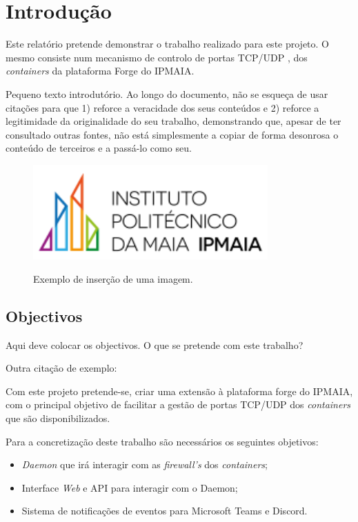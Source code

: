 \chapter{Introdução}
\label{chap:introduction}

Este relatório pretende demonstrar o trabalho realizado para este projeto.
O mesmo consiste num mecanismo de controlo de portas TCP/UDP \cite{rfc9293},
\cite{rfc768} dos \textit{containers} da plataforma Forge do IPMAIA.


Pequeno texto introdutório. Ao longo do documento,
não se esqueça de usar citações \cite{ismai_ead} para que 1)
reforce a veracidade dos seus conteúdos e 2) reforce a legitimidade da
originalidade do seu trabalho, demonstrando que, apesar de ter 
consultado outras fontes, não está simplesmente a copiar de forma desonrosa
o conteúdo de terceiros e a passá-lo como seu.

\begin{figure}[ht]
\begin{center}
\includegraphics[width=9cm]{figs/logo_ipmaia_small.png}
\caption{Exemplo de inserção de uma imagem.}
\label{fig:bookstack}
\end{center}
\end{figure}

\section{Objectivos}
\label{sec:object}

Aqui deve colocar os objectivos. O que se pretende com este trabalho?

Outra citação de exemplo: \cite{rfc4512}

Com este projeto pretende-se, criar uma extensão à plataforma forge do IPMAIA, com o principal objetivo de facilitar a gestão de portas TCP/UDP dos \textit{containers} que são disponibilizados.

Para a concretização deste trabalho são necessários os seguintes objetivos:\\

\begin{itemize}
\item \textit{Daemon} que irá interagir com as \textit{firewall's} dos \textit{containers};
\item Interface \textit{Web} e API para interagir com o Daemon;
\item Sistema de notificações de eventos para Microsoft Teams e Discord.
\end{itemize}

